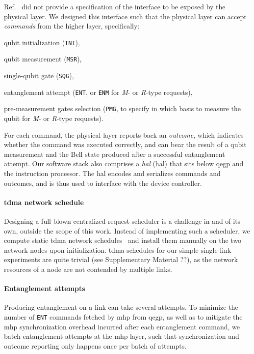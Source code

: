 Ref.~\cite{dahlberg_2019_egp} did not provide a specification of the interface to be exposed by the
physical layer. We designed this interface such that the physical layer can accept \emph{commands}
from the higher layer, specifically:
%
\begin{enumerate*}[label=(\alph*)]
    \item qubit initialization (\texttt{INI}),
    \item qubit measurement (\texttt{MSR}),
    \item single-qubit gate (\texttt{SQG}),
    \item entanglement attempt (\texttt{ENT}, or \texttt{ENM} for \emph{M}- or \emph{R}-type
          requests),
    \item pre-measurement gates selection (\texttt{PMG}, to specify in which basis to measure the
          qubit for \emph{M}- or \emph{R}-type requests).
\end{enumerate*}
For each command, the physical layer reports back an \emph{outcome}, which indicates whether the
command was executed correctly, and can bear the result of a qubit measurement and the Bell state
produced after a successful entanglement attempt. Our software stack also comprises a
\emph{\acrlong{hal}} (\acrshort{hal}) that sits below \acrshort{qegp} and the instruction processor.
The \acrshort{hal} encodes and serializes commands and outcomes, and is thus used to interface with
the device controller.

\paragraph{\acrshort{tdma} network schedule}

Designing a full-blown centralized request scheduler is a challenge in and of its own, outside the
scope of this work. Instead of implementing such a scheduler, we compute static \acrshort{tdma}
network schedules~\cite{skrzypczyk_2021_arch} and install them manually on the two network nodes
upon initialization. \acrshort{tdma} schedules for our simple single-link experiments are quite
trivial (see Supplementary Material ??), as the network resources of a node are not contended by
multiple links.

\paragraph{Entanglement attempts}

Producing entanglement on a link can take several attempts. To minimize the number of \texttt{ENT}
commands fetched by \acrshort{mhp} from \acrshort{qegp}, as well as to mitigate the \acrshort{mhp}
synchronization overhead incurred after each entanglement command, we batch entanglement attempts at
the \acrshort{mhp} layer, such that synchronization and outcome reporting only happens once per
batch of attempts.


